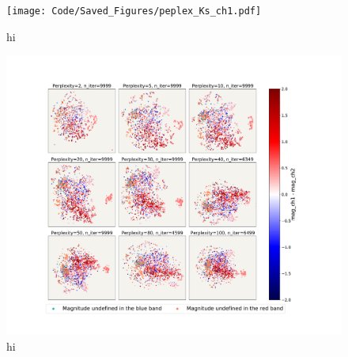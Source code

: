 \begin{figure}[h!]
    \centering
    \texttt{[image: Code/Saved\_Figures/peplex\_Ks\_ch1.pdf]}
    \caption{hi}
    \label{embeddding_ks_ch1}
\end{figure}

\begin{figure}[h!]
    \centering
    \includegraphics[trim={5cm 3cm 5cm 3cm},clip,width=\textwidth]{Code/Saved_Figures/peplex_ch1_ch2.pdf}
    \caption{hi}
    \label{embeddding_ch1_ch2}
\end{figure}